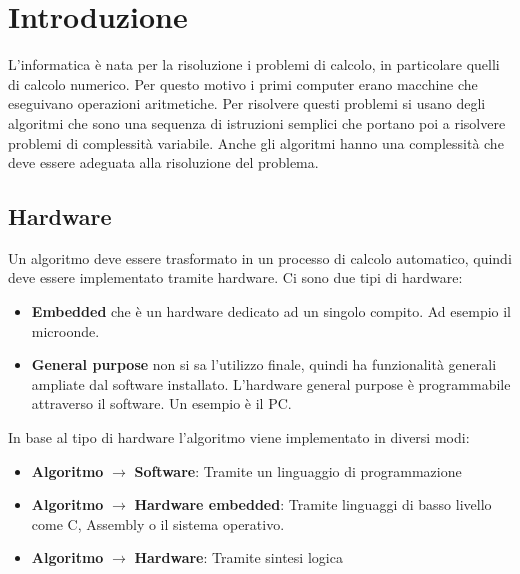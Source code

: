 \documentclass[a4paper]{article}
\theoremstyle{break}
\theoremstyle{break}
\theoremstyle{break}
\theoremstyle{break}
\theoremstyle{break}
\begin{document}


\tableofcontents
\pagebreak
\section{Introduzione}
L'informatica è nata per la risoluzione i problemi di calcolo, in particolare
quelli di calcolo numerico. Per questo motivo i primi computer erano macchine
che eseguivano operazioni aritmetiche. Per risolvere questi problemi si usano
degli algoritmi che sono una sequenza di istruzioni semplici che portano poi
a risolvere problemi di complessità variabile. Anche gli algoritmi hanno una
complessità che deve essere adeguata alla risoluzione del problema.

\subsection{Hardware}
Un algoritmo deve essere trasformato in un processo di calcolo automatico,
quindi deve essere implementato tramite hardware. Ci sono due tipi di hardware:
\begin{itemize}
	\item \textbf{Embedded} che è un hardware dedicato ad un singolo compito.
	      Ad esempio il microonde.
	\item \textbf{General purpose} non si sa l'utilizzo finale, quindi ha
	      funzionalità generali ampliate dal software installato. L'hardware
	      general purpose è programmabile attraverso il software. Un esempio
	      è il PC.
\end{itemize}

In base al tipo di hardware l'algoritmo viene implementato in diversi modi:
\begin{itemize}
	\item \textbf{Algoritmo} \( \to  \) \textbf{Software}: Tramite un linguaggio di programmazione
	\item \textbf{Algoritmo} \( \to  \)  \textbf{Hardware embedded}: Tramite linguaggi di basso livello
	      come C, Assembly o il sistema operativo.
	\item \textbf{Algoritmo} \( \to  \)  \textbf{Hardware}: Tramite sintesi logica
\end{itemize}
\end{document}
